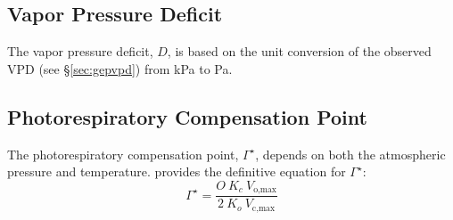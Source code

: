 \subsection{Vapor Pressure Deficit}
\label{sec:d}
The vapor pressure deficit, $D$, is based on the unit conversion of the observed VPD (see \S \ref{sec:gepvpd}) from kPa to Pa.

\subsection{Photorespiratory Compensation Point}
\label{sec:gs}
%
The photorespiratory compensation point, $\Gamma^\star$, depends on both the atmospheric pressure and temperature.
\cite{bernacchi01} provides the definitive equation for $\Gamma^\star$:
\begin{equation}
\label{eq:gsbasic}
    \Gamma^\star = \frac{O\: K_c\: V_\text{o,max}}
                        {2\: K_o\: V_\text{c,max}}
\end{equation}

